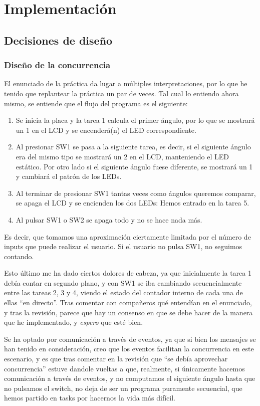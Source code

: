 \documentclass[a4paper,openright,12pt]{article}
\begin{document}
\section{Implementación}
\subsection{Decisiones de diseño}
\subsubsection{Diseño de la concurrencia}\label{concurrencia_angulos}
El enunciado de la práctica da lugar a múltiples interpretaciones, por lo que he tenido que replantear la práctica un par de veces. Tal cual
lo entiendo ahora mismo, se entiende que el flujo del programa es el siguiente:
\begin{enumerate}
    \item Se inicia la placa y la tarea 1 calcula el primer ángulo, por lo que se mostrará un 1 en el LCD y se encenderá(n) el LED correspondiente.
    \item Al presionar SW1 se pasa a la siguiente tarea, es decir, si el siguiente ángulo era del mismo tipo se mostrará un 2 en el LCD, manteniendo el LED estático.
          Por otro lado si el siguiente ángulo fuese diferente, se mostrará un 1 y cambiará el patrón de los LEDs.
    \item Al terminar de presionar SW1 tantas veces como ángulos queremos comparar, se apaga el LCD y se encienden los dos LEDs: Hemos entrado en la tarea 5.
    \item Al pulsar SW1 o SW2 se apaga todo y no se hace nada más. 
\end{enumerate}

Es decir, que tomamos una aproximación ciertamente limitada por el número de inputs que puede realizar el usuario. Si el usuario no pulsa SW1, no seguimos contando.

Esto último me ha dado ciertos dolores de cabeza, ya que inicialmente la tarea 1 debía contar en segundo plano, y con SW1 se iba cambiando secuencialmente entre las tareas 2, 3 y 4,
viendo el estado del contador interno de cada una de ellas ``en directo''. Tras comentar con compañeros qué entendían en el enunciado, y tras la revisión, parece que hay un consenso
en que se debe hacer de la manera que he implementado, y \emph{espero} que esté bien.

\bigskip

Se ha optado por comunicación a través de eventos, ya que si bien los mensajes se han tenido en consideración, creo que los eventos facilitan la concurrencia en este escenario, y es que
tras comentar en la revisión que ``se debía aprovechar concurrencia'' estuve dandole vueltas a que, realmente, si únicamente hacemos comunicación a través de eventos, y no computamos
el siguiente ángulo hasta que no pulsamos el switch, no deja de ser un programa puramente secuencial, que hemos partido en tasks por hacernos la vida más difícil.
\end{document}

